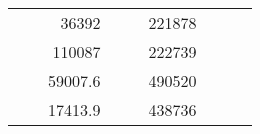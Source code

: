 \begin{table}[H]
\begin{tabular}{|ccrccrccc}
\multicolumn{1}{|c|}{\cellcolor[HTML]{FFFFC7}}                                & \multicolumn{1}{c|}{\cellcolor[HTML]{DAE8FC}}                      & \multicolumn{1}{r|}{\cellcolor[HTML]{DAE8FC}36392}     & \multicolumn{1}{c|}{\cellcolor[HTML]{FFFFC7}}                                & \multicolumn{1}{c|}{\cellcolor[HTML]{DAE8FC}}                       & \multicolumn{1}{r|}{\cellcolor[HTML]{DDFDFF}221878}    &                                                                              &                                                                    &                                                        \\ \cline{3-3} \cline{6-6}
\multicolumn{1}{|c|}{\cellcolor[HTML]{FFFFC7}}                                & \multicolumn{1}{c|}{\cellcolor[HTML]{DAE8FC}}                      & \multicolumn{1}{r|}{\cellcolor[HTML]{DDFDFF}110087}    & \multicolumn{1}{c|}{\cellcolor[HTML]{FFFFC7}}                                & \multicolumn{1}{c|}{\cellcolor[HTML]{DAE8FC}}                       & \multicolumn{1}{r|}{\cellcolor[HTML]{DAE8FC}222739}    &                                                                              &                                                                    &                                                        \\ \cline{3-3} \cline{6-6}
\multicolumn{1}{|c|}{\cellcolor[HTML]{FFFFC7}}                                & \multicolumn{1}{c|}{\cellcolor[HTML]{DAE8FC}}                      & \multicolumn{1}{r|}{\cellcolor[HTML]{DAE8FC}59007.6}   & \multicolumn{1}{c|}{\cellcolor[HTML]{FFFFC7}}                                & \multicolumn{1}{c|}{\cellcolor[HTML]{DAE8FC}}                       & \multicolumn{1}{r|}{\cellcolor[HTML]{DDFDFF}490520}    &                                                                              &                                                                    &                                                        \\ \cline{3-3} \cline{6-6}
\multicolumn{1}{|c|}{\cellcolor[HTML]{FFFFC7}}                                & \multicolumn{1}{c|}{\cellcolor[HTML]{DAE8FC}}                      & \multicolumn{1}{r|}{\cellcolor[HTML]{DDFDFF}17413.9}   & \multicolumn{1}{c|}{\cellcolor[HTML]{FFFFC7}}                                & \multicolumn{1}{c|}{\cellcolor[HTML]{DAE8FC}}                       & \multicolumn{1}{r|}{\cellcolor[HTML]{DAE8FC}438736}    &                                                                              &                                                                    &                                                        \\ \cline{3-3} \cline{6-6}

\end{tabular}
\end{table}
